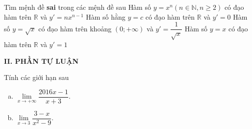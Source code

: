 \begin{ex}%
Tìm mệnh đề \textbf{sai} trong các mệnh đề sau
\choice
{Hàm số $y=x^n (n\in \mathbb{N},n\ge 2)$ có đạo hàm trên $\mathbb{R}$ và $y'=n{x}^{n-1}$}
{Hàm số hằng $y=c$ có đạo hàm trên $\mathbb{R}$ và $y'=0$}
{\True Hàm số $y=\sqrt{x}$ có đạo hàm trên khoảng $(0;+\infty)$ và $y'=\dfrac{1}{\sqrt{x}}$}
{Hàm số $y=x$ có đạo hàm trên $\mathbb{R}$ và $y'=1$}
\end{ex}
\noindent\textbf{II. PHẦN TỰ LUẬN}
\begin{bt}%
	Tính các giới hạn sau
	\begin{enumerate}[a)]
		\item 	$\underset{x\to+\infty}{\mathop{\lim}}\dfrac{2016x-1}{x+3}$.
		\item  $\underset{x\to 3}{\mathop{\lim}}\dfrac{3-x}{x^2-9}$.
	\end{enumerate}
\end{bt}
